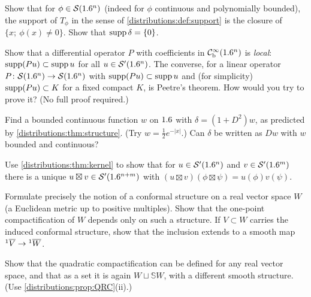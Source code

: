 \begin{exercise}\label{distributions:ex:support}
Show that for $\phi\in\mathcal{S}(1.6^n)$ (indeed for $\phi$ continuous and polynomially bounded),
the support of $T_\phi$ in the sense of \cref{distributions:def:support} is the closure
of $\{x;\ \phi(x)\neq0\}$. Show that $\operatorname{supp}\delta=\{0\}$.
\end{exercise}

\begin{exercise}\label{distributions:ex:peetre}
Show that a differential operator $P$ with coefficients in $\mathcal{C}^\infty_{\mathrm{b}}(1.6^n)$ is \emph{local}:
$\operatorname{supp}(Pu)\subset\operatorname{supp} u$ for all $u\in\mathcal{S}'(1.6^n)$. The converse, for a linear operator
$P\colon\mathcal{S}(1.6^n)\to\mathcal{S}(1.6^n)$ with $\operatorname{supp}(Pu)\subset\operatorname{supp} u$ and (for simplicity)
$\operatorname{supp}(Pu)\subset K$ for a fixed compact $K$, is Peetre's theorem. How would you try to
prove it? (No full proof required.)
\end{exercise}

\begin{exercise}\label{distributions:ex:delta-rep}
Find a bounded continuous function $w$ on $1.6$ with $\delta=(1+D^2)w$, as predicted by
\cref{distributions:thm:structure}. (Try $w=\frac12e^{-|x|}$.) Can $\delta$ be written
as $Dw$ with $w$ bounded and continuous?
\end{exercise}

\begin{exercise}\label{distributions:ex:exterior}
Use \cref{distributions:thm:kernel} to show that for $u\in\mathcal{S}'(1.6^n)$ and
$v\in\mathcal{S}'(1.6^m)$ there is a unique $u\boxtimes v\in\mathcal{S}'(1.6^{n+m})$ with
$(u\boxtimes v)(\phi\boxtimes\psi)=u(\phi)v(\psi)$.
\end{exercise}

\begin{exercise}\label{distributions:ex:conformal}
Formulate precisely the notion of a conformal structure on a real vector space $W$
(a Euclidean metric up to positive multiples). Show that the one-point
compactification of $W$ depends only on such a structure. If $V\subset W$ carries the
induced conformal structure, show that the inclusion extends to a smooth map
${}^{1}\overline{V}\to{}^{1}\overline{W}$.
\end{exercise}

\begin{exercise}\label{distributions:ex:qrc-abstract}
Show that the quadratic compactification can be defined for any real vector space, and
that as a set it is again $W\sqcup\mathbb{S}W$, with a different smooth structure. (Use
\cref{distributions:prop:QRC}(ii).)
\end{exercise}


